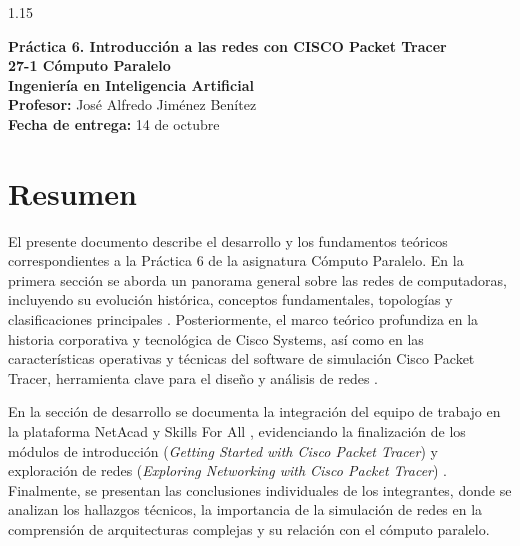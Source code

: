 \documentclass[11pt, a4paper]{article}
\begin{document}
\begin{spacing}{1.15}

\begin{center}
    {\fontsize{16}{19}\selectfont\bfseries Práctica 6. Introducción a las redes con CISCO Packet Tracer}\\[0.4cm]
    {\fontsize{14}{17}\selectfont\bfseries 27-1 Cómputo Paralelo}\\
    {\fontsize{12}{15}\selectfont\bfseries Ingeniería en Inteligencia Artificial}\\[0.3cm]
    \textbf{Profesor:} José Alfredo Jiménez Benítez\\
    \textbf{Fecha de entrega:} 14 de octubre
\end{center}
\vspace{0.3cm}

\section*{Resumen}
El presente documento describe el desarrollo y los fundamentos teóricos correspondientes a la Práctica 6 de la asignatura Cómputo Paralelo. En la primera sección se aborda un panorama general sobre las redes de computadoras, incluyendo su evolución histórica, conceptos fundamentales, topologías y clasificaciones principales \cite{tanenbaum2021, kurose2017}. Posteriormente, el marco teórico profundiza en la historia corporativa y tecnológica de Cisco Systems, así como en las características operativas y técnicas del software de simulación Cisco Packet Tracer, herramienta clave para el diseño y análisis de redes \cite{cisco_history, pt_docs}.

En la sección de desarrollo se documenta la integración del equipo de trabajo en la plataforma NetAcad y Skills For All \cite{cisco_netacad, skillsforall}, evidenciando la finalización de los módulos de introducción (\textit{Getting Started with Cisco Packet Tracer}) \cite{cisco_skills_gettingstarted} y exploración de redes (\textit{Exploring Networking with Cisco Packet Tracer}) \cite{cisco_skills_exploring}. Finalmente, se presentan las conclusiones individuales de los integrantes, donde se analizan los hallazgos técnicos, la importancia de la simulación de redes en la comprensión de arquitecturas complejas y su relación con el cómputo paralelo.


\end{spacing}
\end{document}

